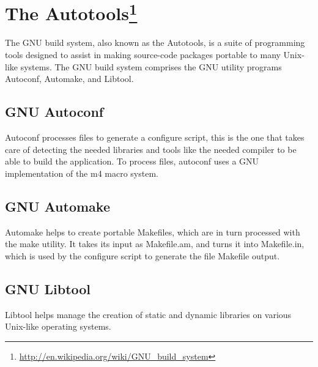 
\section[The Autotools]{The Autotools\footnote{\url{http://en.wikipedia.org/wiki/GNU_build_system}}}\label{sec:autotools}

The GNU build system, also known as the Autotools, is a suite of programming tools designed to assist in making source-code packages portable to many Unix-like systems. The GNU build system comprises the GNU utility programs Autoconf, Automake, and Libtool.

\subsection{GNU Autoconf}\label{sec:Autoconf}

Autoconf processes files to generate a configure script, this is the one that takes care of detecting the needed libraries and tools like the needed compiler to be able to build the application. To process files, autoconf uses a GNU implementation of the m4 macro system.

\subsection{GNU Automake}\label{sec:Automake}

Automake helps to create portable Makefiles, which are in turn processed with the make utility. It takes its input as Makefile.am, and turns it into Makefile.in, which is used by the configure script to generate the file Makefile output.

\subsection{GNU Libtool}\label{sec:Libtool}

Libtool helps manage the creation of static and dynamic libraries on various Unix-like operating systems.
